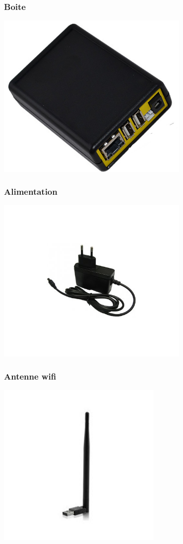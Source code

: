 \documentclass[notes=hide]{beamer}
\begin{document}
\begin{frame}[t]
\frametitle{\textcolor{titre}{Boite}}
  \begin{center}
    \includegraphics[width=0.7\textwidth]{img2/olimex-boite.jpg}
  \end{center}
\end{frame}
\begin{frame}[t]
\frametitle{\textcolor{titre}{Alimentation}}
  \begin{center}
    \includegraphics[width=0.7\textwidth]{img2/adaptateur.jpg}
  \end{center}
\end{frame}

\begin{frame}[t]
\frametitle{\textcolor{titre}{Antenne wifi}}
  \begin{center}
    \includegraphics[width=0.6\textwidth]{img2/antenne.jpg}
  \end{center}
\end{frame}
\end{document}
